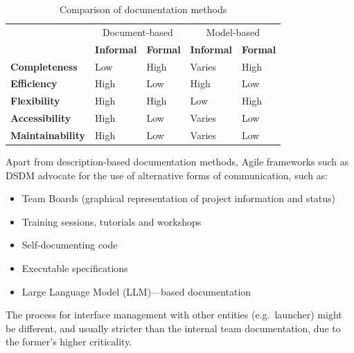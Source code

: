 \documentclass[journal,10pt]{IEEEtran}
\begin{document}
\def\highbad{\textcolor{No}{High}}
\def\highgood{\textcolor{Yes}{High}}
\def\lowbad{\textcolor{No}{Low}}
\def\lowgood{\textcolor{Yes}{Low}}
\def\depends{\textcolor{Maybe}{Varies}}
\begin{table}[h]
	\centering
	\caption{Comparison of documentation methods}
	\label{tab:documentation}
	\begin{tabular}{@{}lllll@{}}
			\toprule
	 & \multicolumn{2}{c}{Document-based} & \multicolumn{2}{c}{Model-based} \\ \cmidrule(r){2-3} \cmidrule(r){4-5}
	 & \textbf{Informal} & \textbf{Formal} & \textbf{Informal} & \textbf{Formal} \\ \midrule
	\textbf{Completeness} & \lowbad  & \highgood  & \depends  & \highgood  \\
	\textbf{Efficiency} & \highgood & \lowbad  & \highgood & \lowbad \\
	\textbf{Flexibility} & \highgood & \highgood  & \lowbad  & \highgood  \\
	\textbf{Accessibility} & \highgood & \lowbad  & \depends  & \lowbad  \\
	\textbf{Maintainability} &  \highgood & \lowbad  & \depends & \lowbad \\
	\bottomrule
	\end{tabular}
\end{table}

Apart from description-based documentation methods, Agile frameworks such as \ac{DSDM} \autocite{agilebusinessconsortiumAgilePMHandbookV22014} advocate for the use of alternative forms of communication, such as:
\begin{itemize}
	\item Team Boards (graphical representation of project information and status) \autocite{agilebusinessconsortiumAgilePMHandbookV22014}
	\item Training sessions, tutorials and workshops
	\item Self-documenting code \autocite{amblerStrategiesAgileSoftware2008}
	\item Executable specifications \autocite{amblerStrategiesAgileSoftware2008}
	\item Large Language Model (LLM)---based documentation
\end{itemize}

The process for interface management with other entities (e.g.~launcher) might be different, and usually stricter than the internal team documentation, due to the former's higher criticality.
\end{document}
